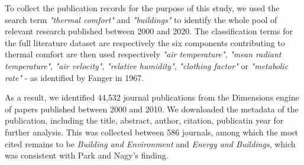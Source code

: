     To collect the publication records for the purpose of this study, we used the search term \textit{"thermal comfort"} and \textit{"buildings"} to identify the whole pool of relevant research published between 2000 and 2020. The classification terms for the full literature dataset are respectively the six components contributing to thermal comfort are then used respectively \textit{"air temperature"}, \textit{"mean radiant temperature"}, \textit{"air velocity"}, \textit{"relative humidity"}, \textit{"clothing factor"} or \textit{"metabolic rate"} - as identified by Fanger in 1967\cite{fanger_calculation_1967}. 

    As a result, we identified 44,532 journal publications from the Dimensions engine of papers published between 2000 and 2010. We downloaded the metadata of the publication, including the title, abstract, author, citation, publicatin year for further analysis. This was collected between 586 journals, among which the most cited remains to be \textit{Building and Environment} and \textit{Energy and Buildings}, which was consistent with Park and Nagy's finding\cite{park_comprehensive_2018}. 